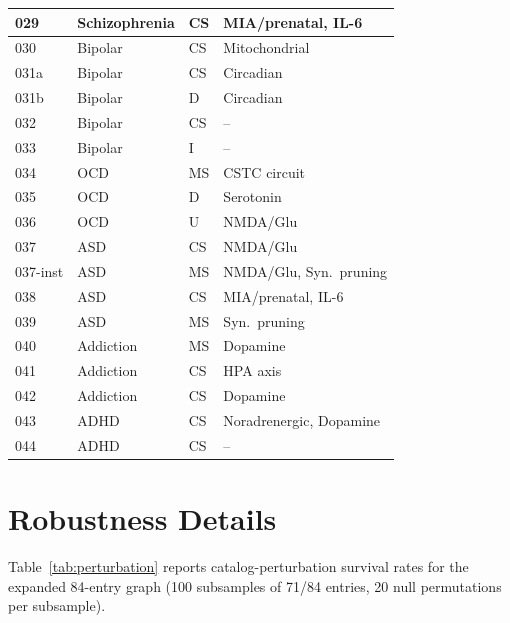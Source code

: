 \documentclass[11pt]{article}
\begin{document}
\begin{table}[h]
\begin{tabular}{llll}
029 & Schizophrenia & CS & MIA/prenatal, IL-6 \\
\midrule
030 & Bipolar & CS & Mitochondrial \\
031a & Bipolar & CS & Circadian \\
031b & Bipolar & D & Circadian \\
032 & Bipolar & CS & -- \\
033 & Bipolar & I & -- \\
\midrule
034 & OCD & MS & CSTC circuit \\
035 & OCD & D & Serotonin \\
036 & OCD & U & NMDA/Glu \\
\midrule
037 & ASD & CS & NMDA/Glu \\
037-inst & ASD & MS & NMDA/Glu, Syn.\ pruning \\
038 & ASD & CS & MIA/prenatal, IL-6 \\
039 & ASD & MS & Syn.\ pruning \\
\midrule
040 & Addiction & MS & Dopamine \\
041 & Addiction & CS & HPA axis \\
042 & Addiction & CS & Dopamine \\
\midrule
043 & ADHD & CS & Noradrenergic, Dopamine \\
044 & ADHD & CS & -- \\
\bottomrule
\end{tabular}
\end{table}

\section{Robustness Details}
\label{app:robustness}

Table~\ref{tab:perturbation} reports catalog-perturbation survival rates for the expanded 84-entry graph (100 subsamples of 71/84 entries, 20 null permutations per subsample).
\end{document}

